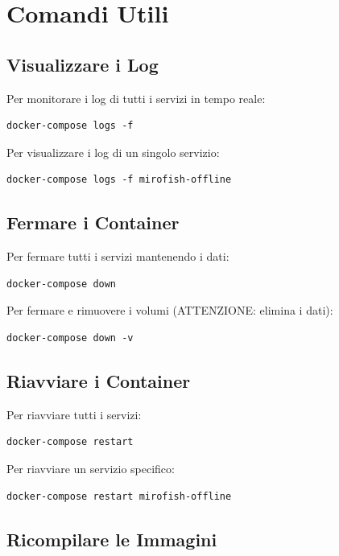 \section{Comandi Utili}

\subsection{Visualizzare i Log}

Per monitorare i log di tutti i servizi in tempo reale:

\begin{lstlisting}
docker-compose logs -f
\end{lstlisting}

Per visualizzare i log di un singolo servizio:

\begin{lstlisting}
docker-compose logs -f mirofish-offline
\end{lstlisting}

\subsection{Fermare i Container}

Per fermare tutti i servizi mantenendo i dati:

\begin{lstlisting}
docker-compose down
\end{lstlisting}

Per fermare e rimuovere i volumi (ATTENZIONE: elimina i dati):

\begin{lstlisting}
docker-compose down -v
\end{lstlisting}

\subsection{Riavviare i Container}

Per riavviare tutti i servizi:

\begin{lstlisting}
docker-compose restart
\end{lstlisting}

Per riavviare un servizio specifico:

\begin{lstlisting}
docker-compose restart mirofish-offline
\end{lstlisting}

\subsection{Ricompilare le Immagini}

